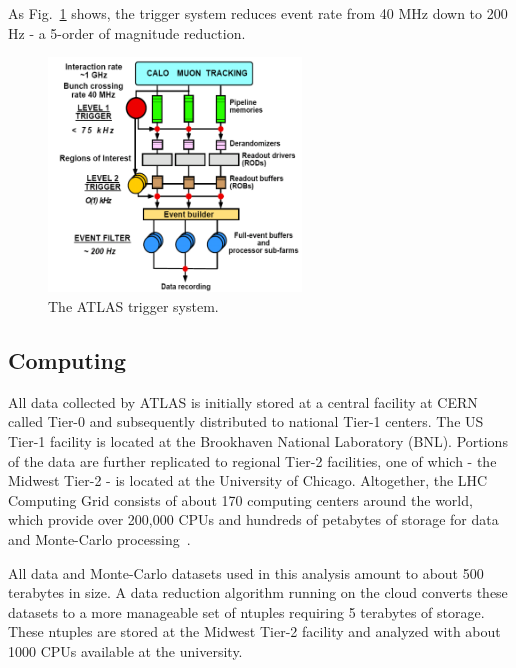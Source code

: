 As Fig.~\ref{fig:det:trigger} shows, the trigger system reduces event rate from 40 MHz down to 200 Hz - a 5-order of magnitude reduction.

\begin{figure}[phtb]
  \begin{center}
    \includegraphics[width=0.60\textwidth]{det/fig/trigger}
    \caption{ The ATLAS trigger system. }
    \label{fig:det:trigger}
  \end{center}
\end{figure}


\subsection{ Computing }

All data collected by ATLAS is initially stored at a central facility at CERN called Tier-0 and subsequently distributed to national Tier-1 centers. The US Tier-1 facility is located at the Brookhaven National Laboratory (BNL). Portions of the data are further replicated to regional Tier-2 facilities, one of which - the Midwest Tier-2 - is located at the University of Chicago. Altogether, the LHC Computing Grid consists of about 170 computing centers around the world, which provide over 200,000 CPUs and hundreds of petabytes of storage for data and Monte-Carlo processing~\cite{Eck:840543,citeulike:8657322}.

All data and Monte-Carlo datasets used in this analysis amount to about 500 terabytes in size. A data reduction algorithm running on the cloud converts these datasets to a more manageable set of ntuples requiring 5 terabytes of storage. These ntuples are stored at the Midwest Tier-2 facility and analyzed with about 1000 CPUs available at the university.

